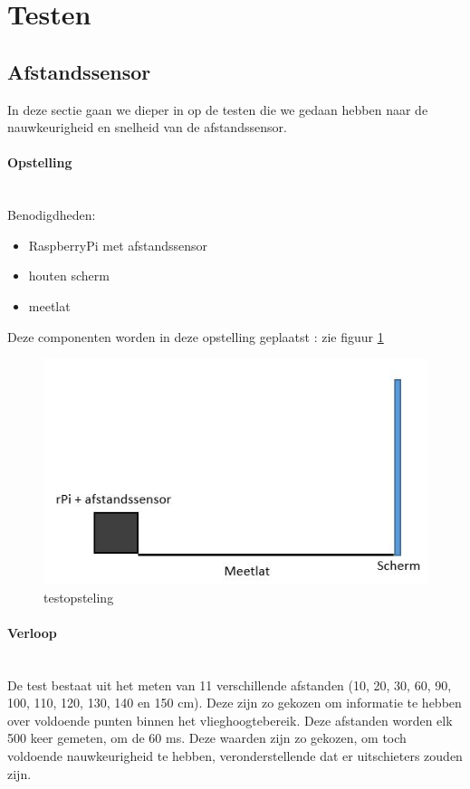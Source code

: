 \documentclass[eind]{penoverslag}
\begin{document}
\section{Testen}
\subsection{Afstandssensor}

In deze sectie gaan we dieper in op de testen die we gedaan hebben naar de nauwkeurigheid en snelheid van de afstandssensor.

\paragraph{Opstelling} ~\\ 
Benodigdheden:
\begin{itemize}
	\item RaspberryPi met afstandssensor
	\item houten scherm
	\item meetlat
\end{itemize}
Deze componenten worden in deze opstelling geplaatst : zie figuur \ref{opstelling}
\begin{figure}[ht!]%
\centering
\includegraphics[scale=0.6]{opstelling.jpg}%
\caption{testopsteling}%
\label{opstelling}%
\end{figure}

\paragraph{Verloop} ~\\ 
De test bestaat uit het meten van 11 verschillende afstanden (10, 20, 30, 60, 90, 100, 110, 120, 130, 140 en 150 cm). Deze zijn zo gekozen om informatie te hebben over voldoende punten binnen het vlieghoogtebereik. Deze afstanden worden elk 500 keer gemeten, om de 60 ms. Deze waarden zijn zo gekozen, om toch voldoende nauwkeurigheid te hebben, veronderstellende dat er uitschieters zouden zijn.
\end{document}

